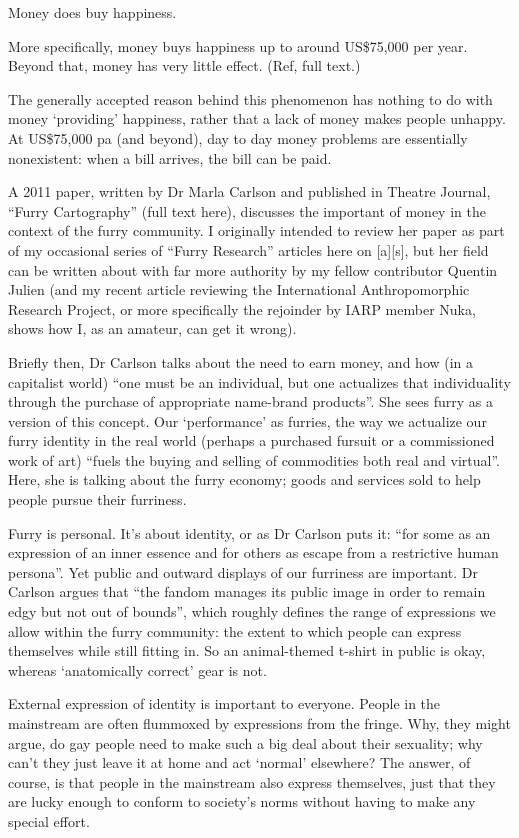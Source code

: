 
Money does buy happiness.

More specifically, money buys happiness up to around US\$75,000 per year. Beyond that, money has very little effect. (Ref, full text.)

The generally accepted reason behind this phenomenon has nothing to do with money `providing' happiness, rather that a lack of money makes people unhappy. At US\$75,000 pa (and beyond), day to day money problems are essentially nonexistent: when a bill arrives, the bill can be paid.

A 2011 paper, written by Dr Marla Carlson and published in Theatre Journal, ``Furry Cartography'' (full text here), discusses the important of money in the context of the furry community. I originally intended to review her paper as part of my occasional series of ``Furry Research'' articles here on [a][s], but her field can be written about with far more authority by my fellow contributor Quentin Julien (and my recent article reviewing the International Anthropomorphic Research Project, or more specifically the rejoinder by IARP member Nuka, shows how I, as an amateur, can get it wrong).

Briefly then, Dr Carlson talks about the need to earn money, and how (in a capitalist world) ``one must be an individual, but one actualizes that individuality through the purchase of appropriate name-brand products''. She sees furry as a version of this concept. Our `performance' as furries, the way we actualize our furry identity in the real world (perhaps a purchased fursuit or a commissioned work of art) ``fuels the buying and selling of commodities both real and virtual''. Here, she is talking about the furry economy; goods and services sold to help people pursue their furriness.

Furry is personal. It's about identity, or as Dr Carlson puts it: ``for some as an expression of an inner essence and for others as escape from a restrictive human persona''. Yet public and outward displays of our furriness are important. Dr Carlson argues that ``the fandom manages its public image in order to remain edgy but not out of bounds'', which roughly defines the range of expressions we allow within the furry community: the extent to which people can express themselves while still fitting in. So an animal-themed t-shirt in public is okay, whereas `anatomically correct' gear is not.

External expression of identity is important to everyone. People in the mainstream are often flummoxed by expressions from the fringe. Why, they might argue, do gay people need to make such a big deal about their sexuality; why can't they just leave it at home and act `normal' elsewhere? The answer, of course, is that people in the mainstream also express themselves, just that they are lucky enough to conform to society's norms without having to make any special effort.

